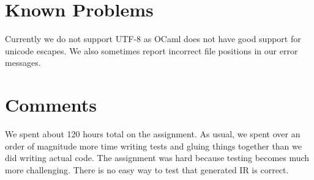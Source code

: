 \documentclass{hw}
\begin{document}
\section{Known Problems}\label{sec:problems}
Currently we do not support UTF-8 as OCaml does not have good support for
unicode escapes. We also sometimes report incorrect file positions in our error
messages.

\section{Comments}\label{sec:comments}
We spent about 120 hours total on the assignment. As usual, we spent over an
order of magnitude more time writing tests and gluing things together than we
did writing actual code. The assignment was hard because testing becomes much
more challenging. There is no easy way to test that generated IR is correct.
\end{document}
